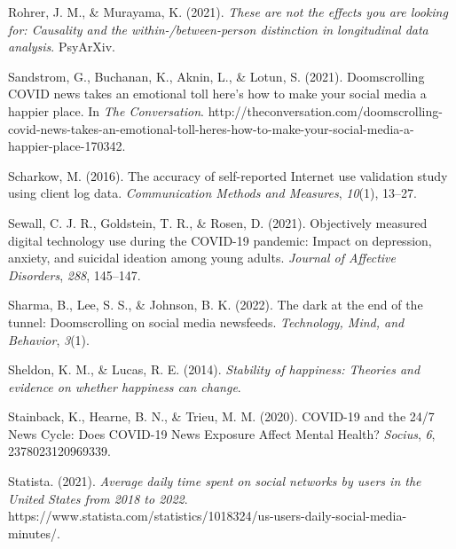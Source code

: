 \documentclass[
  man,mask,floatsintext]{apa7}
\newlength{\cslhangindent}
\newlength{\cslentryspacingunit} %
\newenvironment{CSLReferences}[2] %
 {%
  \setlength{\parindent}{0pt}
  \ifodd #1
  \let\oldpar\par
  \def\par{\hangindent=\cslhangindent\oldpar}
  \fi
  \setlength{\parskip}{#2\cslentryspacingunit}
 }%
 {}
\begin{document}
\begin{CSLReferences}{1}{0}
\leavevmode{}%
Rohrer, J. M., \& Murayama, K. (2021). \emph{These are not the effects you are looking for: {Causality} and the within-/between-person distinction in longitudinal data analysis}. {PsyArXiv}.

\leavevmode{}%
Sandstrom, G., Buchanan, K., Aknin, L., \& Lotun, S. (2021). Doomscrolling {COVID} news takes an emotional toll \textendash{} here's how to make your social media a happier place. In \emph{The Conversation}. http://theconversation.com/doomscrolling-covid-news-takes-an-emotional-toll-heres-how-to-make-your-social-media-a-happier-place-170342.

\leavevmode{}%
Scharkow, M. (2016). The accuracy of self-reported {Internet} use validation study using client log data. \emph{Communication Methods and Measures}, \emph{10}(1), 13--27.

\leavevmode{}%
Sewall, C. J. R., Goldstein, T. R., \& Rosen, D. (2021). Objectively measured digital technology use during the {COVID-19} pandemic: {Impact} on depression, anxiety, and suicidal ideation among young adults. \emph{Journal of Affective Disorders}, \emph{288}, 145--147.

\leavevmode{}%
Sharma, B., Lee, S. S., \& Johnson, B. K. (2022). The dark at the end of the tunnel: {Doomscrolling} on social media newsfeeds. \emph{Technology, Mind, and Behavior}, \emph{3}(1).

\leavevmode{}%
Sheldon, K. M., \& Lucas, R. E. (2014). \emph{Stability of happiness: Theories and evidence on whether happiness can change}.

\leavevmode{}%
Stainback, K., Hearne, B. N., \& Trieu, M. M. (2020). {COVID-19} and the 24/7 {News Cycle}: {Does COVID-19 News Exposure Affect Mental Health}? \emph{Socius}, \emph{6}, 2378023120969339.

\leavevmode{}%
Statista. (2021). \emph{Average daily time spent on social networks by users in the {United States} from 2018 to 2022}. https://www.statista.com/statistics/1018324/us-users-daily-social-media-minutes/.


\end{CSLReferences}
\end{document}
